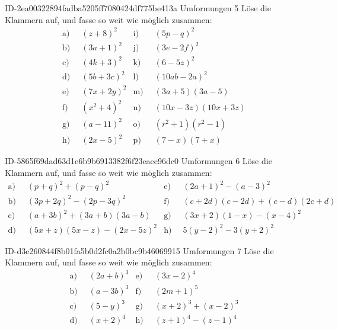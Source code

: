 \begin{exercise}
      {ID-2ea00322894fadba5205ff7080424df775be413a}
      {Umformungen 5}
  \ifproblem\problem
    \newcommand{\gap}{\;\;}%
    Löse die Klammern auf, und fasse so weit wie möglich zusammen:
    \begin{align*}
      \text{a)}\gap & (z+8)^2 &
      \text{i)}\gap & (5p-q)^2
      \\
      \text{b)}\gap & (3a+1)^2 &
      \text{j)}\gap & (3e-2f)^2
      \\
      \text{c)}\gap & (4k+3)^2 &
      \text{k)}\gap & (6-5z)^2
      \\
      \text{d)}\gap & (5b+3c)^2 &
      \text{l)}\gap & (10ab-2a)^2
      \\
      \text{e)}\gap & (7x+2y)^2 &
      \text{m)}\gap & (3a+5)(3a-5)
      \\
      \text{f)}\gap & (x^2+4)^2 &
      \text{n)}\gap & (10x-3z)(10x+3z)
      \\
      \text{g)}\gap & (a-11)^2 &
      \text{o)}\gap & (r^2+1)(r^2-1)
      \\
      \text{h)}\gap & (2x-5)^2 &
      \text{p)}\gap & (7-x)(7+x)
    \end{align*}
  \fi
\end{exercise}

\begin{exercise}
      {ID-5865f69dad63d1e6b9b6913382f6f23eaec96dc0}
      {Umformungen 6}
  \ifproblem\problem
    \newcommand{\gap}{\;\;}%
    Löse die Klammern auf, und fasse so weit wie möglich zusammen:
    \begin{align*}
      \text{a)}\gap & (p+q)^2+(p-q)^2 &
      \text{e)}\gap & (2a+1)^2-(a-3)^2
      \\
      \text{b)}\gap & (3p+2q)^2-(2p-3q)^2 &
      \text{f)}\gap & (c+2d)(c-2d)+(c-d)(2c+d)
      \\
      \text{c)}\gap & (a+3b)^2+(3a+b)(3a-b) &
      \text{g)}\gap & (3x+2)(1-x)-(x-4)^2
      \\
      \text{d)}\gap & (5x+z)(5x-z)-(2x-5z)^2 &
      \text{h)}\gap & 5(y-2)^2-3(y+2)^2
    \end{align*}
  \fi
\end{exercise}

\begin{exercise}
      {ID-d3e260844f8b01fa5b0d2fc0a2b0bc9b46069915}
      {Umformungen 7}
  \ifproblem\problem
    \newcommand{\gap}{\;\;}%
    Löse die Klammern auf, und fasse so weit wie möglich zusammen:
    \begin{align*}
      \text{a)}\gap & (2a+b)^3 &
      \text{e)}\gap & (3x-2)^4
      \\
      \text{b)}\gap & (a-3b)^3 &
      \text{f)}\gap & (2m+1)^5
      \\
      \text{c)}\gap & (5-y)^3 &
      \text{g)}\gap & (x+2)^3+(x-2)^3
      \\
      \text{d)}\gap & (x+2)^4 &
      \text{h)}\gap & (z+1)^4-(z-1)^4
    \end{align*}
  \fi
\end{exercise}


